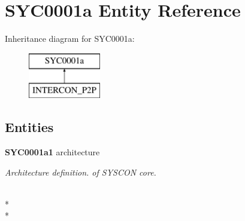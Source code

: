 \section{S\-Y\-C0001a Entity Reference}
\label{class_s_y_c0001a}
Inheritance diagram for S\-Y\-C0001a\-:\begin{figure}[H]
\begin{center}
\leavevmode
\includegraphics[height=2.000000cm]{class_s_y_c0001a}
\end{center}
\end{figure}
\subsection*{Entities}
\begin{DoxyCompactItemize}
\item 
{\bf S\-Y\-C0001a1} architecture
\begin{DoxyCompactList}\small\item\em Architecture definition. of S\-Y\-S\-C\-O\-N core. \end{DoxyCompactList}\end{DoxyCompactItemize}
\\*
\\*

